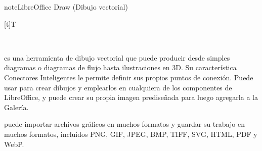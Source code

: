 \documentclass[letterpaper,10pt,spanish]{sphinxmanual}
\let\sphinxpxdimen\pdfpxdimen\else\newdimen\sphinxpxdimen
\begin{document}
\begin{sphinxadmonition}{note}{LibreOffice Draw (Dibujo vectorial)}


\begin{savenotes}\sphinxattablestart
\sphinxthistablewithglobalstyle
\centering
\begin{tabulary}{\linewidth}[t]{T}
\sphinxtoprule
\sphinxtableatstartofbodyhook

\begin{sphinxfigure-in-table}
\centering
\capstart
\noindent\sphinxincludegraphics[width=230\sphinxpxdimen]{{image17}.png}
\label{\detokenize{1_guias/10ofimatica/G1012:id57}}\end{sphinxfigure-in-table}\relax
\\
\sphinxbottomrule
\end{tabulary}
\sphinxtableafterendhook\par
\sphinxattableend\end{savenotes}

\sphinxAtStartPar
{} es una herramienta de dibujo vectorial que puede producir desde simples diagramas o diagramas de flujo hasta ilustraciones en 3D. Su característica Conectores Inteligentes le permite definir sus propios puntos de conexión. Puede usar  para crear dibujos y emplearlos en cualquiera de los componentes de LibreOffice, y puede crear su propia imagen prediseñada para luego agregarla a la Galería.

\sphinxAtStartPar
{} puede importar archivos gráficos en muchos formatos y guardar su trabajo en muchos formatos, incluidos PNG, GIF, JPEG, BMP, TIFF, SVG, HTML, PDF y WebP.
\end{sphinxadmonition}
\end{document}
